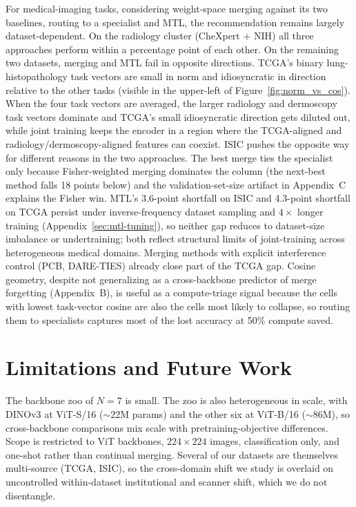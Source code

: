 \documentclass{article}
\begin{document}
For medical-imaging tasks, considering weight-space merging against its two baselines, routing to a specialist and MTL, the recommendation remains largely dataset-dependent. On the radiology cluster (CheXpert + NIH) all three approaches perform within a percentage point of each other. On the remaining two datasets, merging and MTL fail in opposite directions. TCGA's binary lung-histopathology task vectors are small in norm and idiosyncratic in direction relative to the other tasks (visible in the upper-left of Figure~\ref{fig:norm_vs_cos}). When the four task vectors are averaged, the larger radiology and dermoscopy task vectors dominate and TCGA's small idiosyncratic direction gets diluted out, while joint training keeps the encoder in a region where the TCGA-aligned and radiology/dermoscopy-aligned features can coexist. ISIC pushes the opposite way for different reasons in the two approaches. The best merge ties the specialist only because Fisher-weighted merging dominates the column (the next-best method falls 18 points below) and the validation-set-size artifact in Appendix~C explains the Fisher win. MTL's 3.6-point shortfall on ISIC and 4.3-point shortfall on TCGA persist under inverse-frequency dataset sampling and $4\times$ longer training (Appendix~\ref{sec:mtl-tuning}), so neither gap reduces to dataset-size imbalance or undertraining; both reflect structural limits of joint-training across heterogeneous medical domains. Merging methods with explicit interference control (PCB, DARE-TIES) already close part of the TCGA gap. Cosine geometry, despite not generalizing as a cross-backbone predictor of merge forgetting (Appendix~B), is useful as a compute-triage signal because the cells with lowest task-vector cosine are also the cells most likely to collapse, so routing them to specialists captures most of the lost accuracy at 50\% compute saved.

\section{Limitations and Future Work}

The backbone zoo of $N = 7$ is small. The zoo is also heterogeneous in scale, with DINOv3 at ViT-S/16 ($\sim$22M params) and the other six at ViT-B/16 ($\sim$86M), so cross-backbone comparisons mix scale with pretraining-objective differences. Scope is restricted to ViT backbones, $224\times224$ images, classification only, and one-shot rather than continual merging. Several of our datasets are themselves multi-source (TCGA, ISIC), so the cross-domain shift we study is overlaid on uncontrolled within-dataset institutional and scanner shift, which we do not disentangle.
\end{document}
